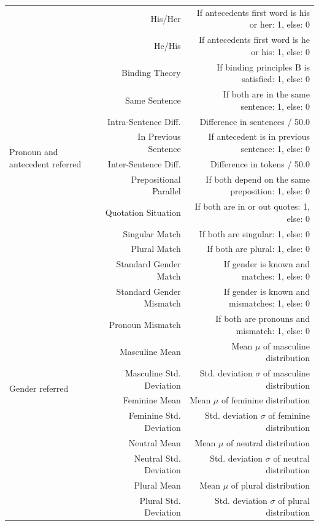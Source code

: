 \begin{table}[p]
{\begin{tabular}{| l |r | r |}
	& His/Her & If antecedents first word is his or her: 1, else: 0 \\ \cline{2-3}
	& He/His & If antecedents first word is he or his: 1, else: 0 \\  \hline
	\hline
	\multirow{9}{1.3cm}{Pronoun and antecedent referred} & Binding Theory & If binding principles B is satisfied: 1, else: 0 \\ \cline{2-3}
 	& Same Sentence &  If both are in the same sentence: 1, else: 0 \\	\cline{2-3}
	& Intra-Sentence Diff. &  Difference in sentences / 50.0 \\	\cline{2-3}
	& In Previous Sentence & If antecedent is in previous sentence: 1, else: 0 \\ \cline{2-3}
	& Inter-Sentence Diff. & Difference in tokens / 50.0\\ \cline{2-3}
	& Prepositional Parallel & If both depend on the same preposition: 1, else: 0 \\ \cline{2-3}
	& Quotation Situation & If both are in or out quotes: 1, else: 0 \\ \cline{2-3}
	& Singular Match & If both are singular: 1, else: 0 \\ \cline{2-3}
	& Plural Match & If both are plural: 1, else: 0 \\ \hline
	\hline
	\multirow{11}{1.3cm}{Gender referred} & Standard Gender Match & If gender is known and matches: 1, else: 0 \\ \cline{2-3}
 	& Standard Gender Mismatch &  If gender is known and mismatches: 1, else: 0 \\	\cline{2-3}
	& Pronoun Mismatch &  If both are pronouns and mismatch: 1, else: 0 \\	\cline{2-3}
	& Masculine Mean & Mean $\mu$ of masculine distribution \\ \cline{2-3}
	& Masculine Std. Deviation & Std. deviation $\sigma$ of masculine distribution \\ \cline{2-3}
	& Feminine Mean &  Mean $\mu$ of feminine distribution \\ \cline{2-3}
	& Feminine Std. Deviation & Std. deviation $\sigma$  of feminine distribution \\ \cline{2-3}
	& Neutral Mean &  Mean $\mu$ of neutral distribution \\ \cline{2-3}
	& Neutral Std. Deviation & Std. deviation $\sigma$  of neutral distribution \\ \cline{2-3}
	& Plural Mean &  Mean $\mu$ of plural distribution \\ \cline{2-3}
	& Plural Std. Deviation & Std. deviation $\sigma$  of plural distribution \\ \hline

  \end{tabular}
}
	\label{table:wholefeatureset}
\end{table}

